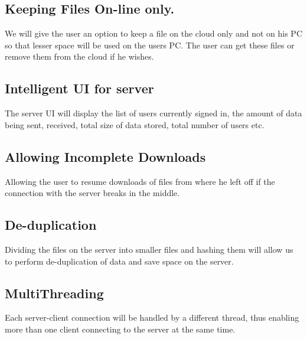 \documentclass{article}
\begin{document}
		\subsection{Keeping Files On-line only.}
				We will give the user an option to keep a file on the cloud only and not on his PC so that lesser space will be used on the users PC. The user can get these files or remove them from the cloud if he wishes.
		\subsection{Intelligent UI for server}
			The server UI will display the list of users currently signed in, the amount of data being sent, received, total size of data stored, total number of users etc.
		\subsection{Allowing Incomplete Downloads}
			Allowing the user to resume downloads of files from where he left off if the connection with the server breaks in the middle.
		\subsection{De-duplication}
			Dividing the files on the server into smaller files and hashing them will allow us to perform de-duplication of data and save space on the server. 
		\subsection{MultiThreading}
			Each server-client connection will be handled by a different thread, thus enabling more than one client connecting to the server at the same time.
\end{document}
